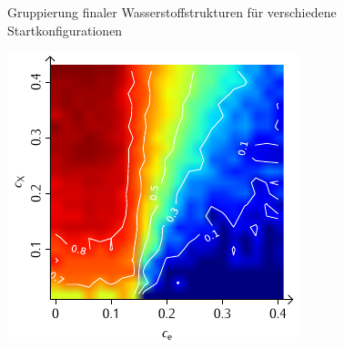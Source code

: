\documentclass[a4paper, 10pt, twoside, openany]{book} %
\begin{document}
\begin{figure}
\begin{minipage}[t]{0.48\textwidth}
        \label{H_penalty_individual_G}
    \end{minipage}
    \caption[Gruppierung finaler Wasserstoffstrukturen]{Gruppierung finaler Wasserstoffstrukturen für verschiedene Startkonfigurationen}
    \label{H_G}
\end{figure}

\begin{figure}
    \begin{minipage}[t]{0.48\textwidth}
        \includegraphics[width=\textwidth]{Abbildungen/Phasendiagramme/Konturen/H_cluster_K.pdf}
        \label{H_cluster_K}
    \end{minipage}
    \hfill
    \begin{minipage}[t]{0.48\textwidth}

\end{minipage}
\end{figure}
\end{document}
